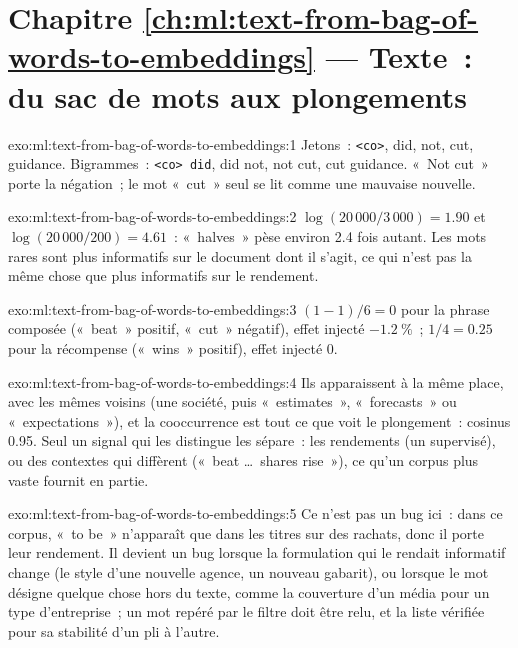 \section*{Chapitre \ref{ch:ml:text-from-bag-of-words-to-embeddings} --- Texte~: du sac de mots aux plongements}

\begin{solution}{exo:ml:text-from-bag-of-words-to-embeddings:1}
Jetons~: \texttt{<co>}, did, not, cut, guidance. Bigrammes~: \texttt{<co> did}, did not, not cut, cut guidance. «~Not cut~»
porte la négation~; le mot «~cut~» seul se lit comme une mauvaise nouvelle.
\end{solution}

\begin{solution}{exo:ml:text-from-bag-of-words-to-embeddings:2}
$\log(20\,000/3\,000) = 1.90$ et $\log(20\,000/200) = 4.61$~: «~halves~» pèse environ 2.4 fois autant. Les mots rares sont
plus informatifs sur le document dont il s'agit, ce qui n'est pas la même chose que plus informatifs sur le rendement.
\end{solution}

\begin{solution}{exo:ml:text-from-bag-of-words-to-embeddings:3}
$(1 - 1)/6 = 0$ pour la phrase composée («~beat~» positif, «~cut~» négatif), effet injecté $-1.2~\%$~; $1/4 = 0.25$
pour la récompense («~wins~» positif), effet injecté 0.
\end{solution}

\begin{solution}{exo:ml:text-from-bag-of-words-to-embeddings:4}
Ils apparaissent à la même place, avec les mêmes voisins (une société, puis «~estimates~», «~forecasts~» ou «~expectations~»), et
la cooccurrence est tout ce que voit le plongement~: cosinus 0.95. Seul un signal qui les distingue les sépare~: les rendements (un
 supervisé), ou des contextes qui diffèrent («~beat \dots\ shares rise~»), ce qu'un corpus plus vaste fournit en partie.
\end{solution}

\begin{solution}{exo:ml:text-from-bag-of-words-to-embeddings:5}
Ce n'est pas un bug ici~: dans ce corpus, «~to be~» n'apparaît que dans les titres sur des rachats, donc il porte leur rendement. Il devient un bug
lorsque la formulation qui le rendait informatif change (le style d'une nouvelle agence, un nouveau gabarit), ou lorsque le mot désigne
quelque chose hors du texte, comme la couverture d'un média pour un type d'entreprise~; un mot repéré par le filtre doit être relu, et
la liste vérifiée pour sa stabilité d'un pli à l'autre.
\end{solution}

